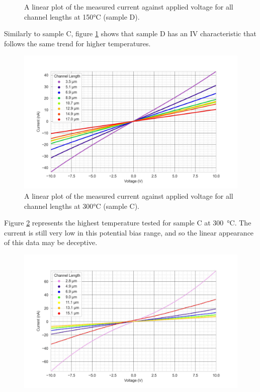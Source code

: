 \begin{refsection}
\begin{figure}[H]
    \caption{A linear plot of the measured current against applied voltage for all channel lengths at 150\si{\degreeCelsius} (sample D).}
    \label{fig:D_current_voltage_150_10V}
\end{figure}
Similarly to sample C, figure \ref{fig:D_current_voltage_150_10V} shows that sample D has an IV characteristic that follows the same trend for higher temperatures.
\begin{figure}[H]
    \centering
    \includegraphics[width=\textwidth]{Chapter3/Figs/Raster/Sample C 2019/IV/10V IV characteristics at 300 C.jpg}
    \caption{A linear plot of the measured current against applied voltage for all channel lengths at 300\si{\degreeCelsius} (sample C).}
    \label{fig:C_current_voltage_300}
\end{figure}
Figure \ref{fig:C_current_voltage_300} represents the highest temperature tested for sample C at 300~\si{\degreeCelsius}. The current is still very low in this potential bias range, and so the linear appearance of this data may be deceptive.
\begin{figure}[H]
    \centering
    \includegraphics[width=\textwidth]{Chapter3/Figs/Raster/Sample D 2019/IV/10V IV characteristics at 300 C.jpg}

\end{figure}
\end{refsection}
